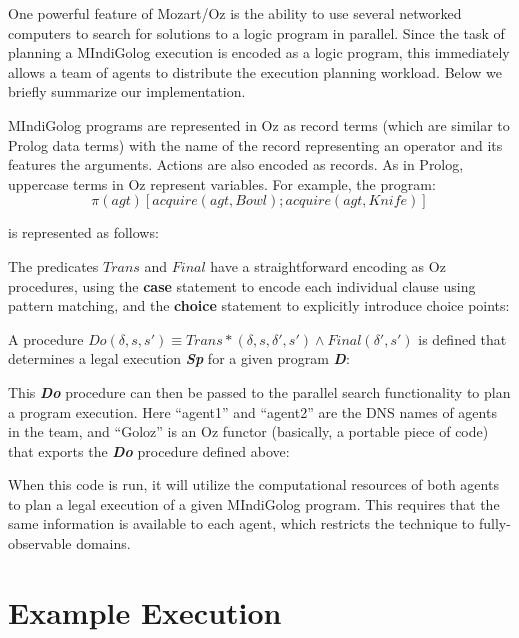 One powerful feature of Mozart/Oz is the ability to use several networked
computers to search for solutions to a logic program in parallel.
Since the task of planning a MIndiGolog execution is encoded as a
logic program, this immediately allows a team of agents to distribute
the execution planning workload. Below we briefly summarize our implementation.

MIndiGolog programs are represented in Oz as record terms (which are
similar to Prolog data terms) with the name of the record representing
an operator and its features the arguments. Actions are also encoded
as records. As in Prolog, uppercase terms in Oz represent variables.
For example, the program:\[
\pi(agt)\left[acquire(agt,Bowl);acquire(agt,Knife)\right]\]


is represented as follows:


The predicates $Trans$ and $Final$ have a straightforward encoding
as Oz procedures, using the \textbf{case} statement to encode each
individual clause using pattern matching, and the \textbf{choice}
statement to explicitly introduce choice points:



A procedure $Do(\delta,s,s')\equiv Trans*(\delta,s,\delta',s')\wedge Final(\delta',s')$
is defined that determines a legal execution \textbf{\emph{Sp}} for
a given program \textbf{\emph{D}}:


This \textbf{\emph{Do}} procedure can then be passed to the parallel
search functionality to plan a program execution. Here {}``agent1''
and {}``agent2'' are the DNS names of agents in the team, and {}``Goloz''
is an Oz functor (basically, a portable piece of code) that exports
the \textbf{\emph{Do}} procedure defined above:


When this code is run, it will utilize the computational resources
of both agents to plan a legal execution of a given MIndiGolog program.
This requires that the same information is available to each agent,
which restricts the technique to fully-observable domains.


\section{Example Execution\label{sec:MIndiGolog:Example-Execution}}

